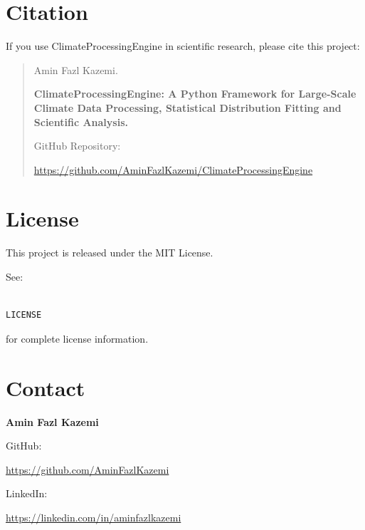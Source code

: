 \documentclass[11pt,a4paper]{article}
\begin{document}
\section{Citation}



If you use ClimateProcessingEngine in scientific research,
please cite this project:



\begin{quote}

Amin Fazl Kazemi.

\textbf{ClimateProcessingEngine:
A Python Framework for Large-Scale Climate Data Processing,
Statistical Distribution Fitting and Scientific Analysis.}

GitHub Repository:

\url{https://github.com/AminFazlKazemi/ClimateProcessingEngine}

\end{quote}




\section{License}



This project is released under the MIT License.



See:


\begin{verbatim}

LICENSE

\end{verbatim}



for complete license information.





\section{Contact}



\textbf{Amin Fazl Kazemi}



GitHub:


\url{https://github.com/AminFazlKazemi}



LinkedIn:


\url{https://linkedin.com/in/aminfazlkazemi}
\end{document}
